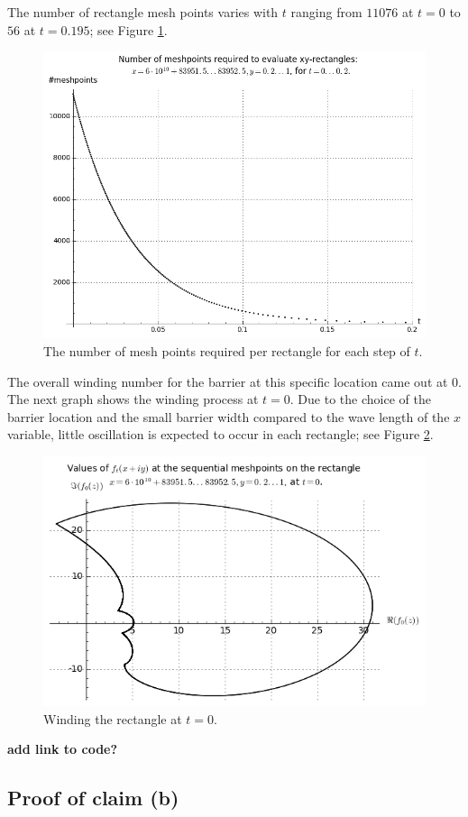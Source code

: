 The number of rectangle mesh points varies with $t$ ranging from $11076$ at $t=0$ to $56$ at $t=0.195$; see Figure \ref{fig3}.

\begin{figure}[h!]
  \includegraphics[width=0.7\linewidth]{Numberofmeshpoints}
  \caption{The number of mesh points required per rectangle for each step of $t$.}\label{fig3}
\end{figure}

The overall winding number for the barrier at this specific location came out at $0$. The next graph shows the winding process at $t=0$. Due to the choice of the barrier location and the small barrier width compared to the wave length of the $x$ variable, little oscillation is expected to occur in each rectangle; see Figure \ref{fig4}.

\begin{figure}[h!]
  \includegraphics[width=0.7\linewidth]{Windingprocess}
  \caption{Winding the rectangle at $t=0$.}\label{fig4}
\end{figure}

{\bf add link to code?}


\subsection{Proof of claim (b)}

